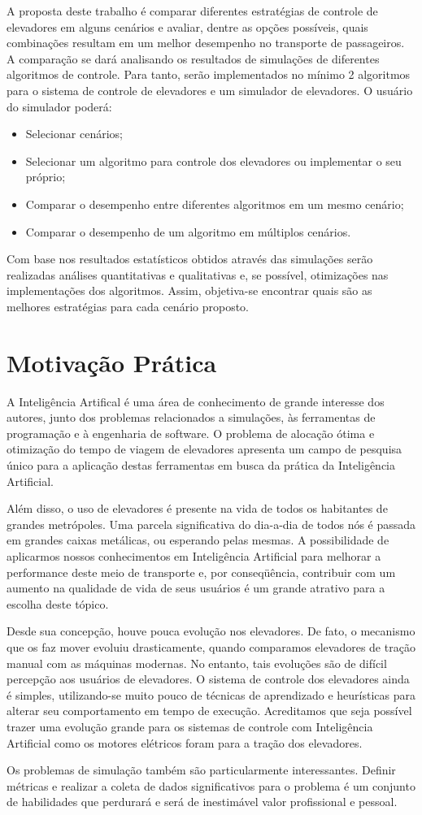 A proposta deste trabalho é comparar diferentes estratégias de controle de elevadores em alguns cenários e avaliar, dentre as opções possíveis, quais combinações resultam em um melhor desempenho no transporte de passageiros. A comparação se dará analisando os resultados de simulações de diferentes algoritmos de controle. Para tanto, serão implementados no mínimo 2 algoritmos para o sistema de controle de elevadores e um simulador de elevadores. O usuário do simulador poderá:

\begin{itemize}
  \item Selecionar cenários;
  \item Selecionar um algoritmo para controle dos elevadores ou implementar o seu próprio;
  \item Comparar o desempenho entre diferentes algoritmos em um mesmo cenário;
  \item Comparar o desempenho de um algoritmo em múltiplos cenários.
\end{itemize}

Com base nos resultados estatísticos obtidos através das simulações serão realizadas análises quantitativas e qualitativas e, se possível, otimizações nas implementações dos algoritmos. Assim, objetiva-se encontrar quais são as melhores estratégias para cada cenário proposto.

\section{Motivação Prática}
A Inteligência Artifical é uma área de conhecimento de grande interesse dos autores, junto dos problemas relacionados a simulações, às ferramentas de programação e à engenharia de software. O problema de alocação ótima e otimização do tempo de viagem de elevadores apresenta um campo de pesquisa único para a aplicação destas ferramentas em busca da prática da Inteligência Artificial.

Além disso, o uso de elevadores é presente na vida de todos os habitantes de grandes metrópoles. Uma parcela significativa do dia-a-dia de todos nós é passada em grandes caixas metálicas, ou esperando pelas mesmas. A possibilidade de aplicarmos nossos conhecimentos em Inteligência Artificial para melhorar a performance deste meio de transporte e, por conseqüência, contribuir com um aumento na qualidade de vida de seus usuários é um grande atrativo para a escolha deste tópico.

Desde sua concepção, houve pouca evolução nos elevadores. De fato, o mecanismo que os faz mover evoluiu drasticamente, quando comparamos elevadores de tração manual com as máquinas modernas. No entanto, tais evoluções são de difícil percepção aos usuários de elevadores. O sistema de controle dos elevadores ainda é simples, utilizando-se muito pouco de técnicas de aprendizado e heurísticas para alterar seu comportamento em tempo de execução. Acreditamos que seja possível trazer uma evolução grande para os sistemas de controle com Inteligência Artificial como os motores elétricos foram para a tração dos elevadores.

Os problemas de simulação também são particularmente interessantes. Definir métricas e realizar a coleta de dados significativos para o problema é um conjunto de habilidades que perdurará e será de inestimável valor profissional e pessoal.